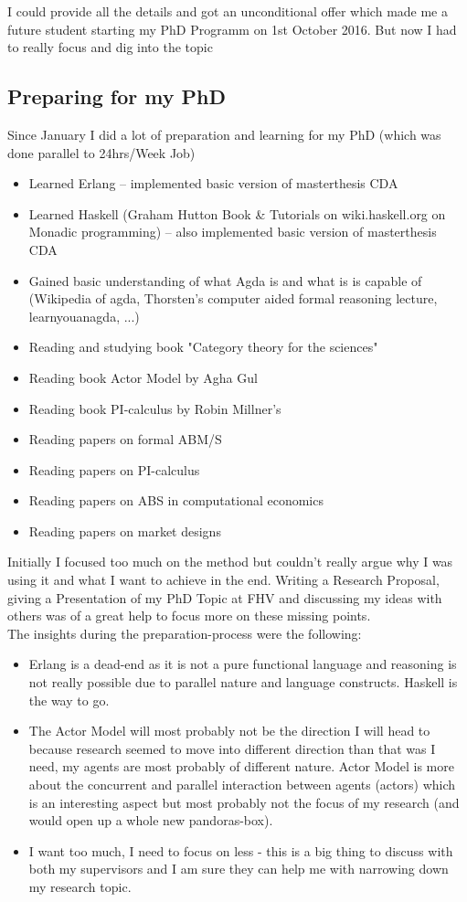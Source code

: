 I could provide all the details and got an unconditional offer which made me a future student starting my PhD Programm on 1st October 2016. But now I had to really focus and dig into the topic

\subsection*{Preparing for my PhD}
Since January I did a lot of preparation and learning for my PhD (which was done parallel to 24hrs/Week Job)

\begin{itemize}
\item Learned Erlang – implemented basic version of masterthesis CDA
\item Learned Haskell (Graham Hutton Book \& Tutorials on wiki.haskell.org on Monadic programming) – also implemented basic version of masterthesis CDA
\item Gained basic understanding of what Agda is and what is is capable of (Wikipedia of agda, Thorsten’s computer aided formal reasoning lecture, learnyouanagda, ...)
\item Reading and studying book "Category theory for the sciences"
\item Reading book Actor Model by Agha Gul
\item Reading book PI-calculus by Robin Millner’s
\item Reading papers on formal ABM/S
\item Reading papers on PI-calculus
\item Reading papers on ABS in computational economics
\item Reading papers on market designs
\end{itemize}

Initially I focused too much on the method but couldn't really argue why I was using it and what I want to achieve in the end. Writing a Research Proposal, giving a Presentation of my PhD Topic at FHV and discussing my ideas with others was of a great help to focus more on these missing points. \\

The insights during the preparation-process were the following:

\begin{itemize}
\item Erlang is a dead-end as it is not a pure functional language and reasoning is not really possible due to parallel nature and language constructs. Haskell is the way to go.
\item The Actor Model will most probably not be the direction I will head to because research seemed to move into different direction than that was I need, my agents are most probably of different nature. Actor Model is more about the concurrent and parallel interaction between agents (actors) which is an interesting aspect but most probably not the focus of my research (and would open up a whole new pandoras-box).
\item I want too much, I need to focus on less - this is a big thing to discuss with both my supervisors and I am sure they can help me with narrowing down my research topic.
\end{itemize}

